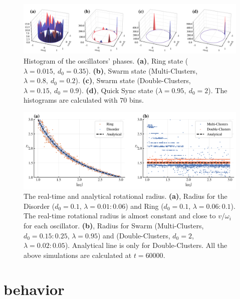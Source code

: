 \documentclass[%
 aip,
 amsmath,amssymb,
 reprint,%
]{revtex4-1}
\begin{document}
\begin{figure}
    \includegraphics[width=\textwidth]{./figs/phaseHist.pdf}
    \caption{
        \label{fig:phaseHist} Histogram of the oscillators' phases.
        \textbf{(a)}, Ring state ($\lambda=0.015,\ d_0=0.35$).
        \textbf{(b)}, Swarm state (Multi-Clusters, $\lambda=0.8,\ d_0=0.2$).
        \textbf{(c)}, Swarm state (Double-Clusters, $\lambda=0.15,\ d_0=0.9$).
        \textbf{(d)}, Quick Sync state ($\lambda=0.95,\ d_0=2$). The histograms are calculated with $70$ bins.
    }
\end{figure}

\begin{figure}
    \includegraphics[width=\textwidth]{./figs/radiusOmega.png}
    \caption{
        \label{fig:radiusOmega} The real-time and analytical rotational radius.
        \textbf{(a)}, Radius for the Disorder ($d_0=0.1$, $\lambda=0.01:0.06$) and Ring ($d_0=0.1$, $\lambda=0.06:0.1$). The real-time rotational radius is almost constant and close to $v/\omega_i$ for each oscillator. 
        \textbf{(b)}, Radius for Swarm (Multi-Clusters, $d_0=0.15:0.25$, $\lambda=0.95$) and (Double-Clusters, $d_0=2$, $\lambda=0.02:0.05$). Analytical line is only for Double-Clusters.
        All the above simulations are calculated at $t=60000$. 
    }
\end{figure}

\section{\label{sec:behavior}behavior}
\end{document}
